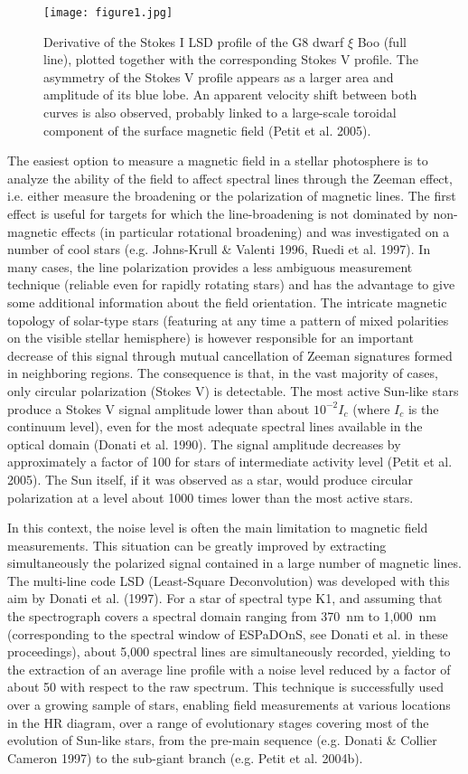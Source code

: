 \documentclass[11pt,twoside]{article}
\begin{document}
\begin{figure}[t]
   \centering
   \texttt{[image: figure1.jpg]}
   \caption{Derivative of the Stokes I LSD profile of the G8 dwarf $\xi$ Boo (full line), plotted together with the corresponding Stokes V profile. The asymmetry of the Stokes V profile appears as a larger area and amplitude of its blue lobe. An apparent velocity shift between both curves is also observed, probably linked to a large-scale toroidal component of the surface magnetic field (Petit et al. 2005).}
   \label{fig:xiboo}
\end{figure}

The easiest option to measure a magnetic field in a stellar photosphere is to analyze the ability of the field to affect spectral lines through the Zeeman effect, i.e. either measure the broadening or the polarization of magnetic lines. The first effect is useful for targets for which the line-broadening is not dominated by non-magnetic effects (in particular rotational broadening) and was investigated on a number of cool stars (e.g. Johns-Krull \& Valenti 1996, Ruedi et al. 1997).  In many cases, the line polarization provides a less ambiguous measurement technique (reliable even for rapidly rotating stars) and has the advantage to give some additional information about the field orientation. The intricate magnetic topology of solar-type stars (featuring at any time a pattern of mixed polarities on the visible stellar hemisphere) is however responsible for an important decrease of this signal through mutual cancellation of Zeeman signatures formed in neighboring regions. The consequence is that, in the vast majority of cases, only circular polarization (Stokes V) is detectable. The most active Sun-like stars produce a Stokes V signal amplitude lower than about $10^{-2} I_c$ (where $I_c$ is the continuum level), even for the most adequate spectral lines available in the optical domain (Donati et al. 1990). The signal amplitude decreases by approximately a factor of 100 for stars of intermediate activity level (Petit et al. 2005). The Sun itself, if it was observed as a star, would produce circular polarization at a level about 1000 times lower than the most active stars.

In this context, the noise level is often the main limitation to magnetic field measurements. This situation can be greatly improved by extracting simultaneously the polarized signal contained in a large number of magnetic lines. The multi-line code LSD (Least-Square Deconvolution) was developed with this aim by Donati et al. (1997). For a star of spectral type K1, and assuming that the spectrograph covers a spectral domain ranging from 370~nm to 1,000~nm (corresponding to the spectral window of ESPaDOnS, see Donati et al. in these proceedings), about 5,000 spectral lines are simultaneously recorded, yielding to the extraction of an average line profile with a noise level reduced by a factor of about 50 with respect to the raw spectrum. This technique is successfully used over a growing sample of stars, enabling field measurements at various locations in the HR diagram, over a range of evolutionary stages covering most of the evolution of Sun-like stars, from the pre-main sequence (e.g. Donati \& Collier Cameron 1997) to the sub-giant branch (e.g. Petit et al. 2004b). 
\end{document}
